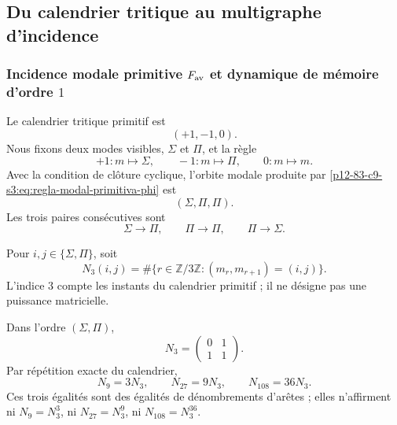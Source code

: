 \subsection{Du calendrier tritique au multigraphe d’incidence}

\subsubsection{Incidence modale primitive \(F_{\rm av}\) et dynamique de mémoire d'ordre \(1\)}

Le calendrier tritique primitif est
\[
 (+1,-1,0).
\]
Nous fixons deux modes visibles, \(\Sigma\) et \(\Pi\), et la règle
\begin{equation}
 +1:m\longmapsto\Sigma,
 \qquad
 -1:m\longmapsto\Pi,
 \qquad
 0:m\longmapsto m.
 \label{p12-83-c9-s3:eq:regla-modal-primitiva-phi}
\end{equation}
Avec la condition de clôture cyclique, l’orbite modale produite par
\eqref{p12-83-c9-s3:eq:regla-modal-primitiva-phi} est
\[
 \boxed{(\Sigma,\Pi,\Pi).}
\]
Les trois paires consécutives sont
\[
 \Sigma\longrightarrow\Pi,
 \qquad
 \Pi\longrightarrow\Pi,
 \qquad
 \Pi\longrightarrow\Sigma.
\]

\begin{definition}
Pour \(i,j\in\{\Sigma,\Pi\}\), soit
\[
 N_3(i,j)=
 \#\{r\in\mathbb Z/3\mathbb Z:(m_r,m_{r+1})=(i,j)\}.
\]
L’indice \(3\) compte les instants du calendrier primitif ; il ne désigne pas une
puissance matricielle.
\end{definition}

\begin{theorem}
\label{p12-83-c9-s3:thm:descenso-incidencia-modal-phi}
Dans l’ordre \((\Sigma,\Pi)\),
\begin{equation}
 \boxed{
 N_3=
 \begin{pmatrix}
 0&1\\
 1&1
 \end{pmatrix}.}
 \label{p12-83-c9-s3:eq:N3-phi}
\end{equation}
Par répétition exacte du calendrier,
\begin{equation}
 \boxed{
 N_9=3N_3,
 \qquad
 N_{27}=9N_3,
 \qquad
 N_{108}=36N_3.}
 \label{p12-83-c9-s3:eq:incidencias-9-27-108-phi}
\end{equation}
Ces trois égalités sont des égalités de dénombrements d’arêtes ; elles n’affirment
ni \(N_9=N_3^3\), ni \(N_{27}=N_3^9\), ni \(N_{108}=N_3^{36}\).
\end{theorem}


